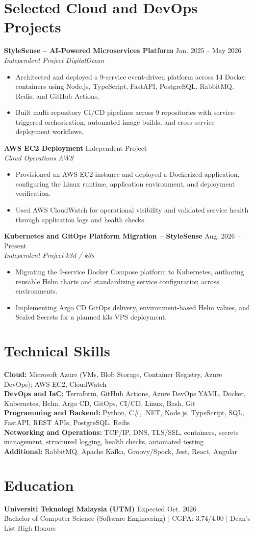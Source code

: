 \documentclass[10pt,a4paper]{article}
\newcommand{\entryheader}[4]{%
  \textbf{#1} \hfill #2\\[-1pt]
  \textit{#3} \hfill \textit{#4}\\[-2pt]
}
\begin{document}
\section*{Selected Cloud and DevOps Projects}
\entryheader{StyleSense -- AI-Powered Microservices Platform}{Jan. 2025 -- May 2026}{Independent Project}{DigitalOcean}
\begin{itemize}
  \item Architected and deployed a 9-service event-driven platform across 14 Docker containers using Node.js, TypeScript, FastAPI, PostgreSQL, RabbitMQ, Redis, and GitHub Actions.
  \item Built multi-repository CI/CD pipelines across 9 repositories with service-triggered orchestration, automated image builds, and cross-service deployment workflows.
\end{itemize}

\entryheader{AWS EC2 Deployment}{Independent Project}{Cloud Operations}{AWS}
\begin{itemize}
  \item Provisioned an AWS EC2 instance and deployed a Dockerized application, conf{}iguring the Linux runtime, application environment, and deployment verif{}ication.
  \item Used AWS CloudWatch for operational visibility and validated service health through application logs and health checks.
\end{itemize}

\entryheader{Kubernetes and GitOps Platform Migration -- StyleSense}{Aug. 2026 -- Present}{Independent Project}{k3d / k3s}
\begin{itemize}
  \item Migrating the 9-service Docker Compose platform to Kubernetes, authoring reusable Helm charts and standardizing service conf{}iguration across environments.
  \item Implementing Argo CD GitOps delivery, environment-based Helm values, and Sealed Secrets for a planned k3s VPS deployment.
\end{itemize}

\section*{Technical Skills}
\textbf{Cloud:} Microsoft Azure (VMs, Blob Storage, Container Registry, Azure DevOps); AWS EC2, CloudWatch\\
\textbf{DevOps and IaC:} Terraform, GitHub Actions, Azure DevOps YAML, Docker, Kubernetes, Helm, Argo CD, GitOps, CI/CD, Linux, Bash, Git\\
\textbf{Programming and Backend:} Python, C\#, .NET, Node.js, TypeScript, SQL, FastAPI, REST APIs, PostgreSQL, Redis\\
\textbf{Networking and Operations:} TCP/IP, DNS, TLS/SSL, containers, secrets management, structured logging, health checks, automated testing\\
\textbf{Additional:} RabbitMQ, Apache Kafka, Groovy/Spock, Jest, React, Angular

\section*{Education}
\textbf{Universiti Teknologi Malaysia (UTM)} \hfill Expected Oct. 2026\\[-1pt]
Bachelor of Computer Science (Software Engineering) \quad | \quad CGPA: 3.74/4.00 \quad | \quad Dean's List High Honors
\end{document}
